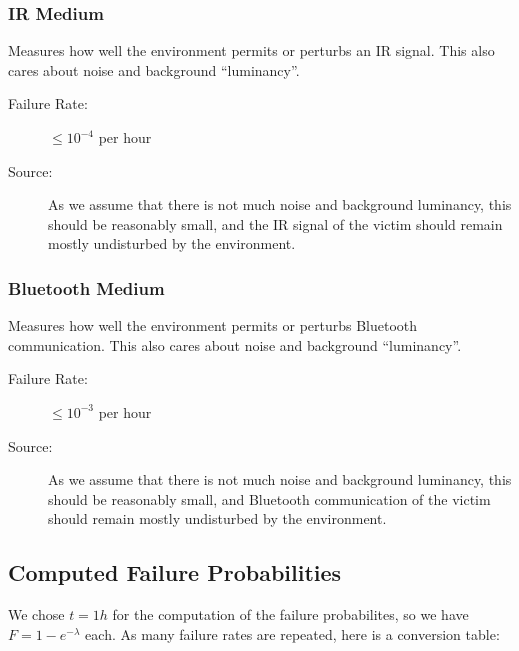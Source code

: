 \documentclass[a4paper,parskip,headheight=38pt]{scrartcl} %
\begin{document}
\subsubsection{IR Medium}
Measures how well the environment permits or perturbs an IR signal.
This also cares about noise and background \enquote{luminancy}.
\begin{description}
\item[Failure Rate:] $\leq 10^{-4}$ per hour
\item[Source:] As we assume that there is not much noise and background
luminancy, this should be reasonably small, and the IR signal of the
victim should remain mostly undisturbed by the environment.
\end{description}

\subsubsection{Bluetooth Medium}
Measures how well the environment permits or perturbs Bluetooth communication.
This also cares about noise and background \enquote{luminancy}.
\begin{description}
\item[Failure Rate:] $\leq 10^{-3}$ per hour
\item[Source:] As we assume that there is not much noise and background
luminancy, this should be reasonably small, and Bluetooth communication
of the victim should remain mostly undisturbed by the environment.
\end{description}

 \pagebreak
\subsection*{Computed Failure Probabilities}

We chose $t = 1h$ for the computation of the failure probabilites, so
we have $F = 1-e^{-\lambda}$ each.  As many failure rates are repeated,
here is a conversion table:

\end{document}

